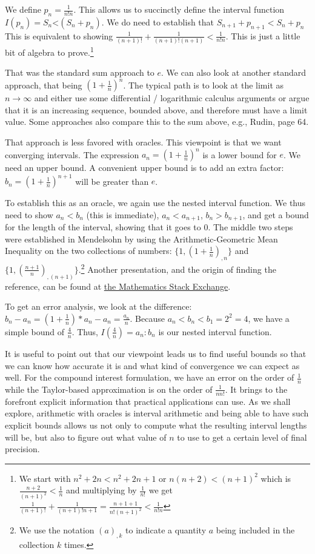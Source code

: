 \documentclass[12pt]{article}
\theoremstyle{remark}
\newcommand{\lt}{\mathord{<}}
\begin{document}
We define $p_n = \frac{1}{n!n}$. This allows us to succinctly define the interval function $I(p_n) = S_n \lt (S_n + p_n)$. We do need to establish that $S_{n+1} + p_{n+1} < S_n + p_n$ This is equivalent to showing $\tfrac{1}{(n+1)!} + \tfrac{1}{(n+1)!(n+1)} < \tfrac{1}{n!n}$. This is just a little bit of algebra to prove.\footnote{We start with $n^2 + 2n < n^2 + 2n + 1$ or $n(n+2) < (n+1)^2$ which is $\tfrac{n+2}{(n+1)^2} < \tfrac{1}{n}$ and multiplying by $\frac{1}{n!}$ we get $\tfrac{1}{(n+1)!} + \tfrac{1}{(n+1)! n+1} = \tfrac{n+1 + 1}{n! (n+1)^2} < \tfrac{1}{n! n}$ }
 
That was the standard sum approach to $e$. We can also look at another standard approach, that being $(1+\frac{1}{n})^n$. The typical path is to look at the limit as $n\to \infty$ and either use some differential / logarithmic calculus arguments or argue that it is an increasing sequence, bounded above, and therefore must have a limit value. Some approaches also compare this to the sum above, e.g., Rudin\cite{rudin}, page 64. 

That approach is less favored with oracles. This viewpoint is that we want converging intervals. The expression $a_n = (1+\frac{1}{n})^n$ is a lower bound for $e$. We need an upper bound. A convenient upper bound is to add an extra factor: $b_n = (1+\frac{1}{n})^{n+1}$ will be greater than $e$. 

To establish this as an oracle, we again use the nested interval function. We thus need to show $a_n < b_n$ (this is immediate), $a_n < a_{n+1}$, $b_n > b_{n+1}$, and get a bound for the length of the interval, showing that it goes to 0. The middle two steps were established in Mendelsohn \cite{mend} by using the Arithmetic-Geometric Mean Inequality on the two collections of numbers: $\{1, (1+ \frac{1}{n})_{,n} \}$ and $\{1, (\frac{n+1}{n})_{,(n+1)}\}$.\footnote{We use the notation $(a)_{,k}$ to indicate a quantity $a$ being included in the collection $k$ times.} Another presentation, and the origin of finding the reference, can be found at \href{https://math.stackexchange.com/questions/389793/what-is-the-most-elementary-proof-that-lim-n-to-infty-11-nn-exists}{the Mathematics Stack Exchange}.

To get an error analysis, we look at the difference: $b_n - a_n = (1+\tfrac{1}{n})*a_n - a_n = \tfrac{a_n}{n}$. Because $a_n < b_n < b_1=2^2 = 4$, we have a simple bound of $\tfrac{4}{n}$. Thus, $I(\tfrac{4}{n}) =  a_n:b_n$ is our nested interval function. 

It is useful to point out that our viewpoint leads us to find useful bounds so that we can know how accurate it is and what kind of convergence we can expect as well. For the compound interest formulation, we have an error on the order of $\frac{1}{n}$ while the Taylor-based approximation is on the order of $\frac{1}{n n!}$. It brings to the forefront explicit information that practical applications can use. As we shall explore, arithmetic with oracles is interval arithmetic and being able to have such explicit bounds allows us not only to compute what the resulting interval lengths will be, but also to figure out what value of $n$ to use to get a certain level of final precision. 
\end{document}
